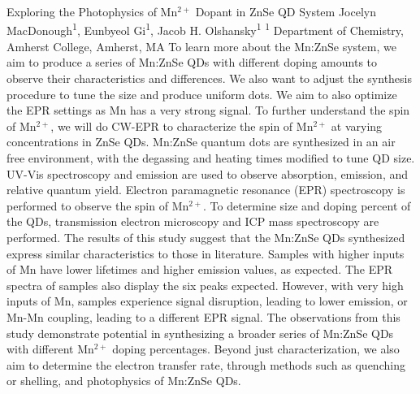 \makeabstract
    {
    Exploring the Photophysics of Mn$^{2+}$ Dopant in ZnSe QD System
    }
    {
    Jocelyn MacDonough\textsuperscript{1}, Eunbyeol Gi\textsuperscript{1}, Jacob H. Olshansky\textsuperscript{1}
    }
    {
    \textsuperscript{1} Department of Chemistry, Amherst College, Amherst, MA
    }
    {
    To learn more about the Mn:ZnSe system, we aim to produce a series of Mn:ZnSe QDs with different doping amounts to observe their characteristics and differences. We also want to adjust the synthesis procedure to tune the size and produce uniform dots. We aim to also optimize the EPR settings as Mn has a very strong signal. To further understand the spin of Mn$^{2+}$, we will do CW-EPR to characterize the spin of Mn$^{2+}$ at varying concentrations in ZnSe QDs.
    }
    {
    Mn:ZnSe quantum dots are synthesized in an air free environment, with the degassing and heating times modified to tune QD size. UV-Vis spectroscopy and emission are used to observe absorption, emission, and relative quantum yield. Electron paramagnetic resonance (EPR) spectroscopy is performed to observe the spin of Mn$^{2+}$. To determine size and doping percent of the QDs, transmission electron microscopy and ICP mass spectroscopy are performed. 
    }
    {
    The results of this study suggest that the Mn:ZnSe QDs synthesized express similar characteristics to those in literature. Samples with higher inputs of Mn have lower lifetimes and higher emission values, as expected. The EPR spectra of samples also display the six peaks expected. However, with very high inputs of Mn, samples experience signal disruption, leading to lower emission, or Mn-Mn coupling, leading to a different EPR signal. 
    }
    {
    The observations from this study demonstrate potential in synthesizing a broader series of Mn:ZnSe QDs with different Mn$^{2+}$ doping percentages. Beyond just characterization, we also aim to determine the electron transfer rate, through methods such as quenching or shelling, and photophysics of Mn:ZnSe QDs.
    }

    \newpage
    